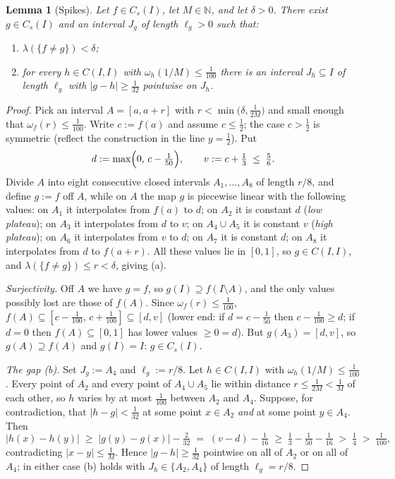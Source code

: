 \documentclass[11pt]{article}
\newtheorem{lemma}[theorem]{Lemma}
\newcommand{\I}{I}
\newcommand{\Cs}{C_s(\I)}
\newcommand{\CI}{C(\I,\I)}
\begin{document}
\begin{lemma}[Spikes]\label{lem:spike}
Let $f\in\Cs$, let $M\in\mathbb N$, and let $\delta>0$.  There exist
$g\in\Cs$ and an interval $J_g$ of length $\ell_g>0$ such that:
\begin{enumerate}
\item[(a)] $\lambda(\{f\ne g\})<\delta$;
\item[(b)] for every $h\in\CI$ with $\omega_h(1/M)\le\tfrac1{100}$ there is an
interval $J_h\subseteq\I$ of length $\ell_g$ with $|g-h|\ge\tfrac1{32}$
\emph{pointwise} on $J_h$.
\end{enumerate}
\end{lemma}

\begin{proof}
Pick an interval $A=[a,a+r]$ with $r<\min\bigl(\delta,\tfrac1{2M}\bigr)$ and small
enough that $\omega_f(r)\le\tfrac1{100}$.  Write $c:=f(a)$ and assume
$c\le\tfrac12$; the case $c>\tfrac12$ is symmetric (reflect the construction in
the line $y=\tfrac12$).  Put
\[
d:=\max\Bigl(0,\,c-\tfrac1{50}\Bigr),
\qquad
v:=c+\tfrac13\;\le\;\tfrac56 .
\]
Divide $A$ into eight consecutive closed intervals $A_1,\dots,A_8$ of length
$r/8$, and define $g:=f$ off $A$, while on $A$ the map $g$ is piecewise linear
with the following values: on $A_1$ it interpolates from $f(a)$ to $d$; on $A_2$
it is constant $d$ (\emph{low plateau}); on $A_3$ it interpolates from $d$ to
$v$; on $A_4\cup A_5$ it is constant $v$ (\emph{high plateau}); on $A_6$ it
interpolates from $v$ to $d$; on $A_7$ it is constant $d$; on $A_8$ it
interpolates from $d$ to $f(a+r)$.  All these values lie in $[0,1]$, so
$g\in\CI$, and $\lambda(\{f\ne g\})\le r<\delta$, giving (a).

\emph{Surjectivity.}  Off $A$ we have $g=f$, so
$g(\I)\supseteq f(\I\setminus A)$, and the only values possibly lost are those of
$f(A)$.  Since $\omega_f(r)\le\tfrac1{100}$,
$f(A)\subseteq[c-\tfrac1{100},\,c+\tfrac1{100}]\subseteq[d,v]$
(lower end: if $d=c-\tfrac1{50}$ then $c-\tfrac1{100}\ge d$; if $d=0$ then
$f(A)\subseteq[0,1]$ has lower values $\ge0=d$).  But $g(A_3)=[d,v]$, so
$g(A)\supseteq f(A)$ and $g(\I)=\I$: $g\in\Cs$.

\emph{The gap (b).}  Set $J_g:=A_4$ and $\ell_g:=r/8$.  Let $h\in\CI$ with
$\omega_h(1/M)\le\tfrac1{100}$.  Every point of $A_2$ and every point of
$A_4\cup A_5$ lie within distance $r\le\tfrac1{2M}<\tfrac1M$ of each other, so
$h$ varies by at most $\tfrac1{100}$ between $A_2$ and $A_4$.  Suppose, for
contradiction, that $|h-g|<\tfrac1{32}$ at some point $x\in A_2$ \emph{and} at
some point $y\in A_4$.  Then
\[
|h(x)-h(y)|\;\ge\;|g(y)-g(x)|-\tfrac2{32}
\;=\;(v-d)-\tfrac1{16}
\;\ge\;\tfrac13-\tfrac1{50}-\tfrac1{16}
\;>\;\tfrac14\;>\;\tfrac1{100},
\]
contradicting $|x-y|\le\tfrac1M$.  Hence $|g-h|\ge\tfrac1{32}$ pointwise on all
of $A_2$ or on all of $A_4$; in either case (b) holds with
$J_h\in\{A_2,A_4\}$ of length $\ell_g=r/8$.
\end{proof}
\end{document}
